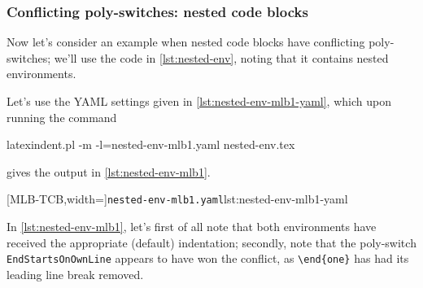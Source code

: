 \documentclass[10pt]{article}
\begin{document}
\subsubsection{Conflicting poly-switches: nested code blocks}
 \begin{example}
 Now let's consider an example when nested code blocks have conflicting poly-switches;
 we'll use the code in \cref{lst:nested-env}, noting that it contains nested
 environments. 


 Let's use the YAML settings given in \cref{lst:nested-env-mlb1-yaml}, which upon running
 the command  

 \begin{commandshell}
latexindent.pl -m -l=nested-env-mlb1.yaml nested-env.tex
\end{commandshell}

 gives the output in \cref{lst:nested-env-mlb1}.

 \begin{cmhtcbraster}[raster column skip=.05\linewidth]
  [MLB-TCB,width=\linewidth]{\texttt{nested-env-mlb1.yaml}}{lst:nested-env-mlb1-yaml}
 \end{cmhtcbraster}

 In \cref{lst:nested-env-mlb1}, let's first of all note that both environments have
 received the appropriate (default) indentation; secondly, note that the poly-switch
 \texttt{EndStartsOnOwnLine} appears to have won the conflict, as \lstinline!\end{one}!
 has had its leading line break removed.
 \end{example}
\end{document}
